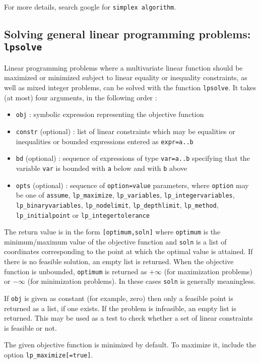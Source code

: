 \documentclass[a4paper,11pt]{book}
\begin{document}
For more details, search google for \verb|simplex algorithm|.

\subsection{Solving general linear programming problems: {\tt lpsolve}}
Linear programming problems where a multivariate linear function should be maximized or minimized subject to linear equality or inequality constraints, as well as mixed integer problems, can be solved with the function {\tt lpsolve}. It takes (at most) four arguments, in the following order :
\begin{itemize}
\item {\tt obj} : symbolic expression representing the objective function
\item {\tt constr} (optional) : list of linear constraints which may be equalities or inequalities or bounded expressions entered as {\tt expr=a..b}
\item {\tt bd} (optional) : sequence of expressions of type {\tt var=a..b} specifying that the variable {\tt var} is bounded with {\tt a} below and with {\tt b} above
\item {\tt opts} (optional) : sequence of {\tt option=value} parameters, where {\tt option} may be one of {\tt assume}, {\tt lp\_maximize}, {\tt lp\_variables}, {\tt lp\_integervariables}, {\tt lp\_binaryvariables}, {\tt lp\_nodelimit}, {\tt lp\_depthlimit}, {\tt lp\_method}, {\tt lp\_initialpoint} or {\tt lp\_integertolerance}
\end{itemize}
The return value is in the form {\tt [optimum,soln]} where {\tt optimum} is the minimum/maximum value of the objective function and {\tt soln} is a list of coordinates corresponding to the point at which the optimal value is attained. If there is no feasible solution, an empty list is returned. When the objective function is unbounded, {\tt optimum} is returned as $ +\infty $ (for maximization problems) or $ -\infty $ (for minimization problems). In these cases {\tt soln} is generally meaningless.

If {\tt obj} is given as constant (for example, zero) then only a feasible point is returned as a list, if one exists. If the problem is infeasible, an empty list is returned. This may be used as a test to check whether a set of linear constraints is feasible or not.

The given objective function is minimized by default. To maximize it, include the option {\tt lp\_maximize[=true]}.
\end{document}
